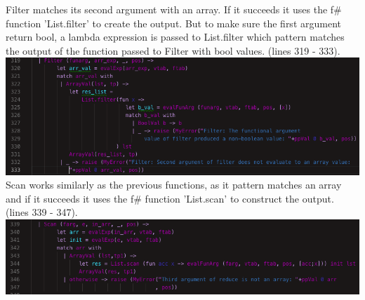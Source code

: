 Filter matches its second argument with an array. If it succeeds it uses the f\# function 'List.filter' to create the output. But to make sure the first argument return bool, a lambda expression is passed to List.filter which pattern matches the output of the function passed to Filter with bool values. (lines 319 - 333).\\
\includegraphics[width=\linewidth]{Materials/Interpreter/Filter}\\
Scan works similarly as the previous functions, as it pattern matches an array and if it succeeds it uses the f\# function 'List.scan' to construct the output. (lines 339 - 347).\\
\includegraphics[width=\linewidth]{Materials/Interpreter/Scan}\\